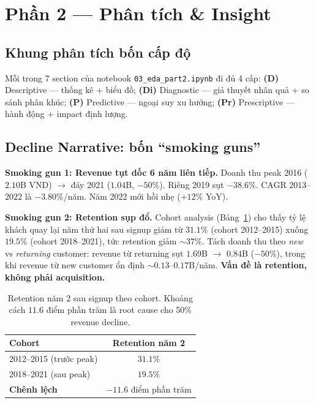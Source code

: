 \documentclass[10pt]{article}
\begin{document}
\section{Phần 2 --- Phân tích \& Insight}

\subsection{Khung phân tích bốn cấp độ}

Mỗi trong 7 section của notebook \texttt{03\_eda\_part2.ipynb} đi đủ 4 cấp:
\textbf{(D)} Descriptive --- thống kê + biểu đồ;
\textbf{(Di)} Diagnostic --- giả thuyết nhân quả + so sánh phân khúc;
\textbf{(P)} Predictive --- ngoại suy xu hướng;
\textbf{(Pr)} Prescriptive --- hành động + impact định lượng.

\subsection{Decline Narrative: bốn ``smoking guns''}

\textbf{Smoking gun 1: Revenue tụt dốc 6 năm liên tiếp.}
Doanh thu peak 2016 ($2.10$B VND) $\to$ đáy 2021 ($1.04$B, $-50\%$). Riêng 2019 sụt $-38.6\%$. CAGR $2013$--$2022$ là $-3.80\%$/năm. Năm 2022 mới hồi nhẹ ($+12\%$ YoY).

\textbf{Smoking gun 2: Retention sụp đổ.} Cohort analysis (Bảng~\ref{tab:cohort}) cho thấy tỷ lệ khách quay lại năm thứ hai sau signup giảm từ $31.1\%$ (cohort 2012--2015) xuống $19.5\%$ (cohort 2018--2021), tức retention giảm $\sim 37\%$.
Tách doanh thu theo \emph{new} vs \emph{returning} customer: revenue từ returning sụt $1.69$B $\to$ $0.84$B ($-50\%$), trong khi revenue từ new customer ổn định $\sim 0.13$--$0.17$B/năm. \textbf{Vấn đề là retention, không phải acquisition.}

\begin{table}[h]
\centering
\small
\caption{Retention năm 2 sau signup theo cohort. Khoảng cách $11.6$ điểm phần trăm là root cause cho 50\% revenue decline.}
\label{tab:cohort}
\begin{tabular}{lc}
\toprule
\textbf{Cohort} & \textbf{Retention năm 2} \\
\midrule
2012--2015 (trước peak) & $31.1\%$ \\
2018--2021 (sau peak)   & $19.5\%$ \\
\midrule
\textbf{Chênh lệch}     & $-11.6$ điểm phần trăm \\
\bottomrule
\end{tabular}
\end{table}
\end{document}
